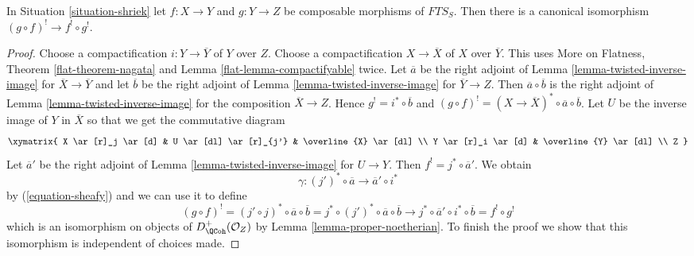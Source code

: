 %
\begin{lemma}
\label{lemma-upper-shriek-composition}
In Situation \ref{situation-shriek} let $f : X \to Y$ and $g : Y \to Z$
be composable morphisms of $\textit{FTS}_S$. Then there is a canonical
isomorphism $(g \circ f)^! \to f^! \circ g^!$.
\end{lemma}

\begin{proof}
Choose a compactification $i : Y \to \overline{Y}$ of $Y$ over $Z$.
Choose a compactification $X \to \overline{X}$ of $X$ over
$\overline{Y}$. This uses More on Flatness, Theorem \ref{flat-theorem-nagata}
and Lemma \ref{flat-lemma-compactifyable} twice.
Let $\overline{a}$ be the
right adjoint of Lemma \ref{lemma-twisted-inverse-image} for
$\overline{X} \to \overline{Y}$ and let $\overline{b}$
be the
right adjoint of Lemma \ref{lemma-twisted-inverse-image} for
$\overline{Y} \to Z$.
Then $\overline{a} \circ \overline{b}$ is the
right adjoint of Lemma \ref{lemma-twisted-inverse-image} for
the composition $\overline{X} \to Z$.
Hence $g^! = i^* \circ \overline{b}$ and
$(g \circ f)^! = (X \to \overline{X})^* \circ \overline{a} \circ \overline{b}$.
Let $U$ be the inverse image of $Y$ in $\overline{X}$
so that we get the commutative diagram
$$
\xymatrix{
X \ar[r]_j \ar[d] & U \ar[dl] \ar[r]_{j'} & \overline{X} \ar[dl] \\
Y \ar[r]_i \ar[d] & \overline{Y} \ar[dl] \\
Z
}
$$
Let $\overline{a}'$ be the
right adjoint of Lemma \ref{lemma-twisted-inverse-image} for
$U \to Y$.
Then $f^! = j^* \circ \overline{a}'$. We obtain
$$
\gamma : (j')^* \circ \overline{a} \to \overline{a}' \circ i^*
$$
by (\ref{equation-sheafy}) and we can use it to define
$$
(g \circ f)^! =
(j' \circ j)^* \circ \overline{a} \circ \overline{b} =
j^* \circ (j')^* \circ \overline{a} \circ \overline{b}
\to
j^* \circ \overline{a}' \circ i^* \circ \overline{b} =
f^! \circ g^!
$$
which is an isomorphism on objects of $D_\QCoh^+(\mathcal{O}_Z)$ by
Lemma \ref{lemma-proper-noetherian}. To finish the proof we show that
this isomorphism is independent of choices made.


\end{proof}
